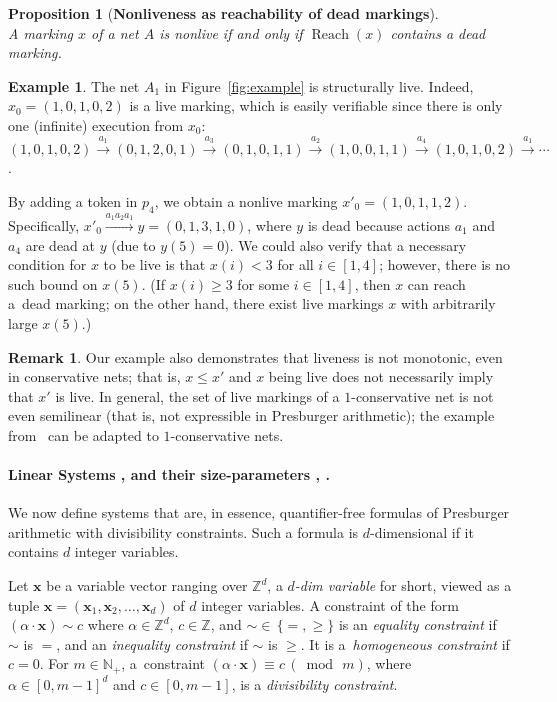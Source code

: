 \documentclass[11pt,a4paper]{amsart}
\DeclareMathOperator{\Reach}{Reach}
\newcommand{\step}[1]{\mathrel{\xrightarrow{#1}}}
\newcommand{\bvar}[1]{\mathbf{#1}}
\newcommand{\nnorm}[1]{||#1||}
\newcommand{\Nat}{\mathbb{N}}
\newcommand{\Zset}{\mathbb{Z}}
\newcommand{\setN}{\Nat}
\newcommand{\setZ}{\Zset}
\newcommand{\scalar}[2]{(#1 \cdot #2)}
\newcommand{\mlcm}[1]{\operatorname{lcm}(#1)}
\theoremstyle{plain}
\newtheorem{prop}[thm]{Proposition}
\theoremstyle{definition}
\newtheorem{rem}[thm]{Remark}
\newtheorem{exa}[thm]{Example}
\theoremstyle{defC}
\theoremstyle{thmC}
\begin{document}
\begin{prop}[\textbf{Nonliveness as reachability of dead markings}]\label{prop:nonlivereachdead}
\hfill\\
	A marking $x$ of a net $A$ is nonlive if and only if 
	$\Reach(x)$ contains a dead marking.
\end{prop}



\begin{exa}\label{exa:basiclive}
The net $A_1$ in Figure~\ref{fig:example} 
is structurally live. Indeed, $x_0=(1,0,1,0,2)$ is a
    live marking, which is easily verifiable since there is only one (infinite)
    execution from $x_0$: $(1,0,1,0,2) \step{a_1} (0,1,2,0,1) \step{a_3}
    (0,1,0,1,1) \step{a_2} (1,0,0,1,1) \step{a_4}
    (1,0,1,0,2)\step{a_1}\cdots$.

   By adding a token in $p_4$, we obtain a nonlive marking
	$x'_0=(1,0,1,1,2)$. Specifically,
	$x'_0\step{a_1a_2a_1}y=(0,1,3,1,0)$,
where $y$ is dead because actions $a_1$ and $a_4$ are dead at $y$
	(due to
	$y(5)=0$).
We could also verify that a necessary condition for $x$ to be live is
that 
$x(i)< 3$ for all $i\in[1,4]$; however, there is no such bound on $x(5)$.
(If $x(i)\geq 3$ for some $i\in[1,4]$, then $x$ can reach a~dead
	marking; on the other hand, there exist live markings $x$ with arbitrarily
	large $x(5)$.)
\end{exa}

\begin{rem}
Our example also demonstrates that liveness is not monotonic, even
in conservative nets; that is, $x\leq x'$ and $x$ being live does not
	necessarily imply that $x'$
is live. In general, the set of live markings of
	a $1$-conservative net is not even semilinear (that is, not expressible
	in Presburger arithmetic); the example
	from~\cite{DBLP:journals/acta/JancarP19} can be adapted to
	$1$-conservative nets.
\end{rem}	


\paragraph{Linear Systems , and their size-parameters
\bm{${\nnorm{S}}$},
\bm{${\mlcm{S}}$}.} 
We now define systems that are, in essence, 
quantifier-free formulas of Presburger arithmetic with divisibility 
constraints. Such a formula is $d$-dimensional if it contains $d$ 
integer variables.

Let $\bvar{x}$ be a variable vector ranging over $\setZ^d$, a \emph{$d$-dim
variable} for short, viewed as a tuple
$\bvar{x}=(\bvar{x}_1,\bvar{x}_2,\dots,\bvar{x}_d)$ of $d$ integer
variables.
A constraint of
the form $\scalar{\alpha}{\bvar{x}}\sim c$ where $\alpha\in \setZ^d$,
$c\in\setZ$, and $\sim\mathop{\in}\,\{=,\geq\}$ is an \emph{equality
constraint} if $\sim$ is $=$, and an \emph{inequality constraint} if
$\sim$ is $\geq$. It is a~\emph{homogeneous constraint} if $c=0$.
For $m\in\setN_+$, a~constraint 
$\scalar{\alpha}{\bvar{x}}\equiv c\,(\bmod\, m)$, where
$\alpha\in[0,m{-}1]^d$ and $c\in [0,m{-}1]$, is a \emph{divisibility constraint}.
\end{document}
